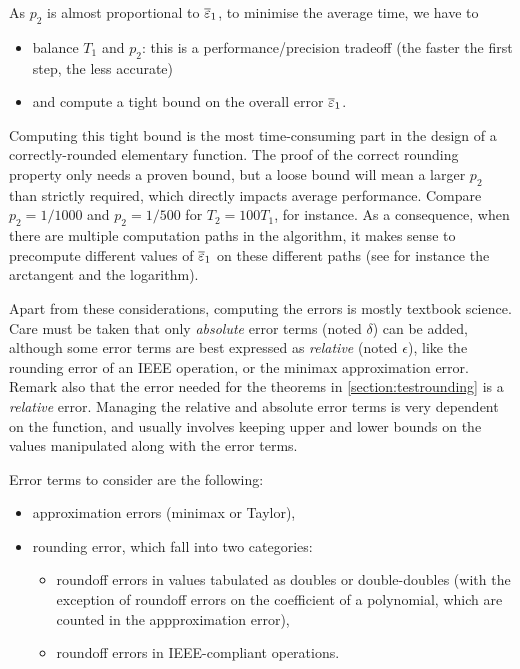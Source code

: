 As $p_2$ is almost proportional to ${\overline{\varepsilon}}_1$, to minimise the average
time, we have to
\begin{itemize}
\item balance $T_1$ and $p_2$: this is a performance/precision
  tradeoff (the faster the first step, the less accurate)
\item and compute a tight bound on the overall error  ${\overline{\varepsilon}}_1$.
\end{itemize}

Computing this tight bound is the most time-consuming part in the
design of a correctly-rounded elementary function. The proof of the
correct rounding property only needs a proven bound, but a loose bound
will mean a larger $p_2$ than strictly required, which directly
impacts average performance. Compare $p_2=1/1000$ and $p_2=1/500$ for
$T_2=100T_1$, for instance. As a consequence, when there are multiple
computation paths in the algorithm, it makes sense to precompute
different values of ${\overline{\varepsilon}}_1$ on these different paths (see for
instance the arctangent and the logarithm).






Apart from these considerations, computing the errors is mostly
textbook science. Care must be taken that only \emph{absolute} error terms
(noted $\delta$) can be added, although some error terms are best
expressed as \emph{relative} (noted $\epsilon$), like the rounding
error of an IEEE operation, or the minimax approximation error. Remark
also that the error needed for the theorems in
\ref{section:testrounding} is a \emph{relative} error.  Managing the
relative and absolute error terms is very dependent on the function,
and usually involves keeping upper and lower bounds on the values
manipulated along with the error terms.

Error terms to consider are the following:
\begin{itemize}
\item approximation errors  (minimax or Taylor),
\item rounding error, which fall into two categories:
  \begin{itemize}
  \item roundoff errors in values tabulated as doubles or
    double-doubles (with the exception of roundoff errors on the coefficient
    of a polynomial, which are counted in the appproximation error),
  \item roundoff errors in IEEE-compliant operations.
  \end{itemize}
\end{itemize}



